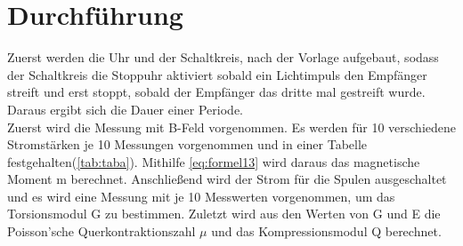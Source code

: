 \section{Durchführung}
\label{sec:Durchführung}

Zuerst werden die Uhr und der Schaltkreis, nach der Vorlage aufgebaut, sodass der Schaltkreis die Stoppuhr aktiviert sobald ein Lichtimpuls den Empfänger streift und erst stoppt, sobald der Empfänger das dritte mal gestreift wurde.
Daraus ergibt sich die Dauer einer Periode.
\\
Zuerst wird die Messung mit B-Feld vorgenommen.
Es werden für 10 verschiedene Stromstärken je 10 Messungen vorgenommen und in einer Tabelle festgehalten(\autoref{tab:taba}).
Mithilfe \autoref{eq:formel13} wird daraus das magnetische Moment m berechnet.
Anschließend wird der Strom für die Spulen ausgeschaltet und es wird eine Messung mit je 10 Messwerten vorgenommen, um das Torsionsmodul G zu bestimmen.
Zuletzt wird aus den Werten von G und E die Poisson'sche Querkontraktionszahl $\mu$ und das Kompressionsmodul Q berechnet.